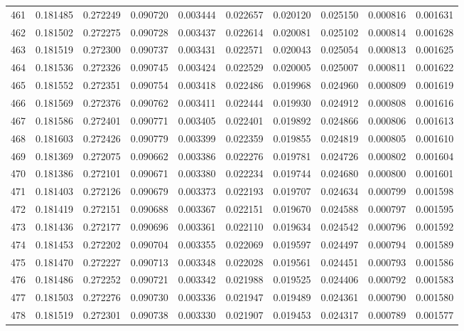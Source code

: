 \begin{tabular}{lrrrrrrrrr}
461 & 0.181485 & 0.272249 & 0.090720 & 0.003444 & 0.022657 & 0.020120 & 0.025150 & 0.000816 & 0.001631 \\
462 & 0.181502 & 0.272275 & 0.090728 & 0.003437 & 0.022614 & 0.020081 & 0.025102 & 0.000814 & 0.001628 \\
463 & 0.181519 & 0.272300 & 0.090737 & 0.003431 & 0.022571 & 0.020043 & 0.025054 & 0.000813 & 0.001625 \\
464 & 0.181536 & 0.272326 & 0.090745 & 0.003424 & 0.022529 & 0.020005 & 0.025007 & 0.000811 & 0.001622 \\
465 & 0.181552 & 0.272351 & 0.090754 & 0.003418 & 0.022486 & 0.019968 & 0.024960 & 0.000809 & 0.001619 \\
466 & 0.181569 & 0.272376 & 0.090762 & 0.003411 & 0.022444 & 0.019930 & 0.024912 & 0.000808 & 0.001616 \\
467 & 0.181586 & 0.272401 & 0.090771 & 0.003405 & 0.022401 & 0.019892 & 0.024866 & 0.000806 & 0.001613 \\
468 & 0.181603 & 0.272426 & 0.090779 & 0.003399 & 0.022359 & 0.019855 & 0.024819 & 0.000805 & 0.001610 \\
469 & 0.181369 & 0.272075 & 0.090662 & 0.003386 & 0.022276 & 0.019781 & 0.024726 & 0.000802 & 0.001604 \\
470 & 0.181386 & 0.272101 & 0.090671 & 0.003380 & 0.022234 & 0.019744 & 0.024680 & 0.000800 & 0.001601 \\
471 & 0.181403 & 0.272126 & 0.090679 & 0.003373 & 0.022193 & 0.019707 & 0.024634 & 0.000799 & 0.001598 \\
472 & 0.181419 & 0.272151 & 0.090688 & 0.003367 & 0.022151 & 0.019670 & 0.024588 & 0.000797 & 0.001595 \\
473 & 0.181436 & 0.272177 & 0.090696 & 0.003361 & 0.022110 & 0.019634 & 0.024542 & 0.000796 & 0.001592 \\
474 & 0.181453 & 0.272202 & 0.090704 & 0.003355 & 0.022069 & 0.019597 & 0.024497 & 0.000794 & 0.001589 \\
475 & 0.181470 & 0.272227 & 0.090713 & 0.003348 & 0.022028 & 0.019561 & 0.024451 & 0.000793 & 0.001586 \\
476 & 0.181486 & 0.272252 & 0.090721 & 0.003342 & 0.021988 & 0.019525 & 0.024406 & 0.000792 & 0.001583 \\
477 & 0.181503 & 0.272276 & 0.090730 & 0.003336 & 0.021947 & 0.019489 & 0.024361 & 0.000790 & 0.001580 \\
478 & 0.181519 & 0.272301 & 0.090738 & 0.003330 & 0.021907 & 0.019453 & 0.024317 & 0.000789 & 0.001577 \\

\end{tabular}
